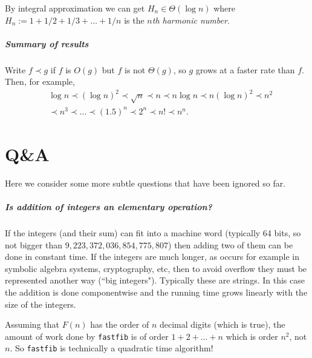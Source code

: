 \begin{Example} 
By integral approximation we can get $H_n \in \Theta(\log n)$ where 
$H_n:=1+ 1/2 + 1/3 + \dots + 1/n$ is the \emph{$n$th harmonic number}. 
\end{Example}

\paragraph{Summary of results}
Write $f \prec g$ if $f$ is $O(g)$ but $f$ is not $\Theta(g)$, so $g$ grows at a
 faster rate than $f$. Then, for example, 
\begin{align*}
& \log n \prec (\log n)^2 \prec \sqrt{n} \prec n \prec n \log n 
 \prec n (\log n)^2 \prec n^2 \\
& \prec n^3 \prec \dots \prec (1.5)^n \prec 2^n \prec n! \prec n^n.
\end{align*}




\chapter{Q\&A} %

Here we consider some more subtle questions that have been ignored so far.

\paragraph{Is addition of integers an elementary operation?}

If the integers (and their sum) can fit into a machine word (typically 64 bits, so not bigger than $9,223,372,036,854,775,807$) then 
adding two of them can be done in constant time. If the integers are much longer, as occurs for example in symbolic algebra systems, cryptography, etc, then to avoid overflow they must be represented another way (``big integers"). Typically these are strings. In this case the addition is done componentwise and the running time grows linearly with the size of the integers. 

\begin{Example}
Assuming that $F(n)$ has the order of $n$ decimal digits (which is true), the amount of work 
done by \texttt{fastfib} is of order $1+2+\dots + n$ which is order $n^2$, not $n$. 
So \texttt{fastfib} is technically a quadratic time algorithm!
\end{Example}


